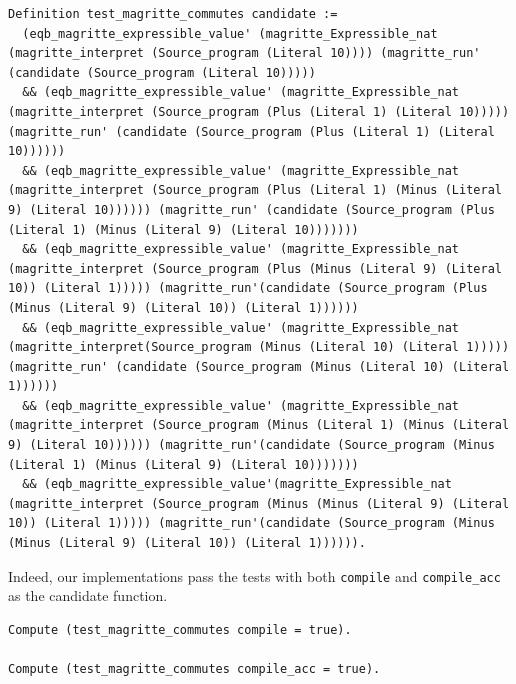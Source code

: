 \documentclass{article}
\begin{document}
\begin{lstlisting}
Definition test_magritte_commutes candidate :=
  (eqb_magritte_expressible_value' (magritte_Expressible_nat (magritte_interpret (Source_program (Literal 10)))) (magritte_run' (candidate (Source_program (Literal 10)))))
  && (eqb_magritte_expressible_value' (magritte_Expressible_nat (magritte_interpret (Source_program (Plus (Literal 1) (Literal 10))))) (magritte_run' (candidate (Source_program (Plus (Literal 1) (Literal 10))))))
  && (eqb_magritte_expressible_value' (magritte_Expressible_nat (magritte_interpret (Source_program (Plus (Literal 1) (Minus (Literal 9) (Literal 10)))))) (magritte_run' (candidate (Source_program (Plus (Literal 1) (Minus (Literal 9) (Literal 10)))))))
  && (eqb_magritte_expressible_value' (magritte_Expressible_nat (magritte_interpret (Source_program (Plus (Minus (Literal 9) (Literal 10)) (Literal 1))))) (magritte_run'(candidate (Source_program (Plus (Minus (Literal 9) (Literal 10)) (Literal 1))))))
  && (eqb_magritte_expressible_value' (magritte_Expressible_nat (magritte_interpret(Source_program (Minus (Literal 10) (Literal 1))))) (magritte_run' (candidate (Source_program (Minus (Literal 10) (Literal 1))))))
  && (eqb_magritte_expressible_value' (magritte_Expressible_nat (magritte_interpret (Source_program (Minus (Literal 1) (Minus (Literal 9) (Literal 10)))))) (magritte_run'(candidate (Source_program (Minus (Literal 1) (Minus (Literal 9) (Literal 10)))))))
  && (eqb_magritte_expressible_value'(magritte_Expressible_nat (magritte_interpret (Source_program (Minus (Minus (Literal 9) (Literal 10)) (Literal 1))))) (magritte_run'(candidate (Source_program (Minus (Minus (Literal 9) (Literal 10)) (Literal 1)))))).
\end{lstlisting}

Indeed, our implementations pass the tests with both \texttt{compile} and \texttt{compile\_acc} as the candidate function.

\begin{lstlisting}
Compute (test_magritte_commutes compile = true).

Compute (test_magritte_commutes compile_acc = true).
\end{lstlisting}
\end{document}
